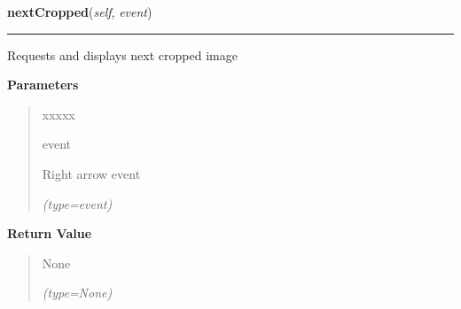\hspace{.8\funcindent}\begin{boxedminipage}{\funcwidth}

    \raggedright \textbf{nextCropped}(\textit{self}, \textit{event})

    \vspace{-1.5ex}

    \rule{\textwidth}{0.5\fboxrule}
\setlength{\parskip}{2ex}
    Requests and displays next cropped image

\setlength{\parskip}{1ex}
      \textbf{Parameters}
      \vspace{-1ex}

      \begin{quote}
        \begin{Ventry}{xxxxx}

          \item[event]

          Right arrow event

            {\it (type=event)}

        \end{Ventry}

      \end{quote}

      \textbf{Return Value}
    \vspace{-1ex}

      \begin{quote}
      None

      {\it (type=None)}

      \end{quote}

    \end{boxedminipage}

    \label{client_gui:GuiClass:prevCropped}

    \vspace{0.5ex}

